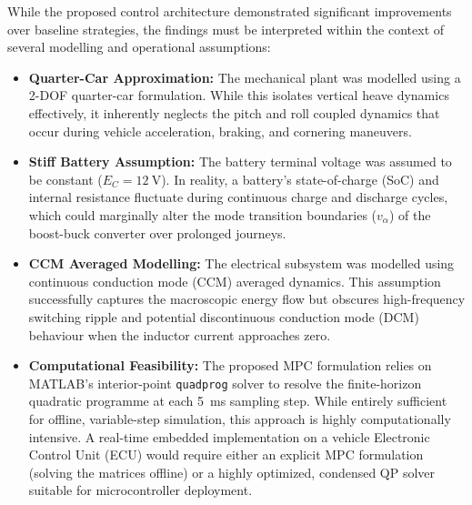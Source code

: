 While the proposed control architecture demonstrated significant improvements over baseline strategies, the findings must be interpreted within the context of several modelling and operational assumptions:
\begin{itemize}
    \item \textbf{Quarter-Car Approximation:} The mechanical plant was modelled using a 2-DOF quarter-car formulation. While this isolates vertical heave dynamics effectively, it inherently neglects the pitch and roll coupled dynamics that occur during vehicle acceleration, braking, and cornering maneuvers.
    \item \textbf{Stiff Battery Assumption:} The battery terminal voltage was assumed to be constant ($E_C = \SI{12}{\volt}$). In reality, a battery's state-of-charge (SoC) and internal resistance fluctuate during continuous charge and discharge cycles, which could marginally alter the mode transition boundaries ($v_\alpha$) of the boost-buck converter over prolonged journeys.
    \item \textbf{CCM Averaged Modelling:} The electrical subsystem was modelled using continuous conduction mode (CCM) averaged dynamics. This assumption successfully captures the macroscopic energy flow but obscures high-frequency switching ripple and potential discontinuous conduction mode (DCM) behaviour when the inductor current approaches zero.
    \item \textbf{Computational Feasibility:} The proposed MPC formulation relies on MATLAB's interior-point \texttt{quadprog} solver to resolve the finite-horizon quadratic programme at each \SI{5}{\milli\second} sampling step. While entirely sufficient for offline, variable-step simulation, this approach is highly computationally intensive. A real-time embedded implementation on a vehicle Electronic Control Unit (ECU) would require either an explicit MPC formulation (solving the matrices offline) or a highly optimized, condensed QP solver suitable for microcontroller deployment.
\end{itemize}


